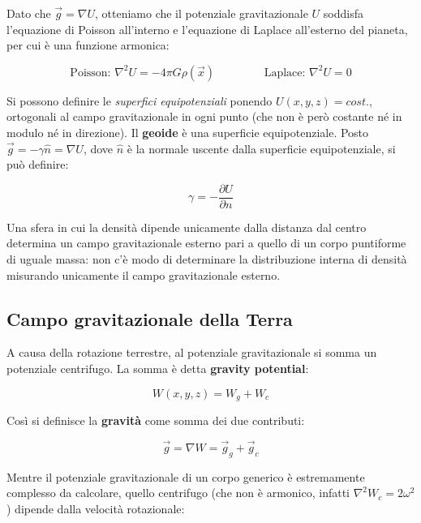 \documentclass[a4paper,12pt]{book}
\begin{document}
\noindent
Dato che $\vec{g} = \nabla U$, otteniamo che il potenziale gravitazionale $U$ soddisfa l'equazione di Poisson all'interno e l'equazione di Laplace all'esterno del pianeta, per cui è una funzione armonica:

\begin{equation}
    \text{Poisson: } \nabla^2 U = - 4 \pi G \rho(\vec{x}) \text{ }\text{ }\text{ }\text{ }\text{ }\text{ }\text{  Laplace: } \nabla^2U=0
\end{equation}

\noindent
Si possono definire le \textit{superfici equipotenziali} ponendo $U(x,y,z) = cost.$, ortogonali al campo gravitazionale in ogni punto (che non è però costante né in modulo né in direzione).
Il \textbf{geoide} è una superficie equipotenziale.
Posto $\vec{g} = - \gamma \hat{n} = \nabla U$, dove $\hat{n}$ è la normale uscente dalla superficie equipotenziale, si può definire:

\begin{equation}
    \gamma = - \frac{\partial U}{\partial n}
\end{equation}

\noindent
Una sfera in cui la densità dipende unicamente dalla distanza dal centro determina un campo gravitazionale esterno pari a quello di un corpo puntiforme di uguale massa: non c'è modo di determinare la distribuzione interna di densità misurando unicamente il campo gravitazionale esterno.

\subsection{\textcolor{colore7}{Campo gravitazionale della Terra}}

A causa della rotazione terrestre, al potenziale gravitazionale si somma un potenziale centrifugo.
La somma è detta \textbf{gravity potential}:

\begin{equation}
    W(x,y,z) = W_g + W_c
\end{equation}

\noindent Così si definisce la \textbf{gravità} come somma dei due contributi:

\begin{equation}
    \vec{g} = \nabla W = \vec{g}_g + \vec{g}_c
\end{equation}

Mentre il potenziale gravitazionale di un corpo generico è estremamente complesso da calcolare, quello centrifugo (che non è armonico, infatti $\nabla^2W_c = 2\omega^2$) dipende dalla velocità rotazionale:
\end{document}

